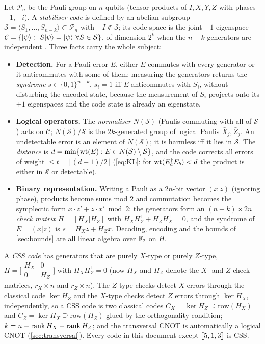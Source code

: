 Let $\mathcal P_n$ be the Pauli group on $n$ qubits (tensor products of $I,X,Y,Z$ with phases $\pm1,\pm i$). A \emph{stabiliser code} is defined by an abelian subgroup $\mathcal S=\langle S_1,\dots,S_{n-k}\rangle\subset\mathcal P_n$ with $-I\notin\mathcal S$; its code space is the joint $+1$ eigenspace $\mathcal C=\{\ket\psi:\ S\ket\psi=\ket\psi\ \forall S\in\mathcal S\}$, of dimension $2^k$ when the $n-k$ generators are independent \cite{gottesman97,crss98}. Three facts carry the whole subject:
\begin{itemize}[leftmargin=*]
\item \textbf{Detection.} For a Pauli error $E$, either $E$ commutes with every generator or it anticommutes with some of them; measuring the generators returns the \emph{syndrome} $s\in\{0,1\}^{n-k}$, $s_i=1$ iff $E$ anticommutes with $S_i$, without disturbing the encoded state, because the measurement of $S_i$ projects onto its $\pm1$ eigenspaces and the code state is already an eigenstate.
\item \textbf{Logical operators.} The \emph{normaliser} $N(\mathcal S)$ (Paulis commuting with all of $\mathcal S$) acts on $\mathcal C$; $N(\mathcal S)/\mathcal S$ is the $2k$-generated group of logical Paulis $\bar X_j,\bar Z_j$. An undetectable error is an element of $N(\mathcal S)$; it is harmless iff it lies in $\mathcal S$. The \emph{distance} is $d=\min\{\operatorname{wt}(E):E\in N(\mathcal S)\setminus\mathcal S\}$, and the code corrects all errors of weight $\le t=\lfloor(d-1)/2\rfloor$ (\cref{eq:KL}: for $\operatorname{wt}(E_a^\dagger E_b)<d$ the product is either in $\mathcal S$ or detectable).
\item \textbf{Binary representation.} Writing a Pauli as a $2n$-bit vector $(x|z)$ (ignoring phase), products become sums mod $2$ and commutation becomes the symplectic form $x\cdot z'+z\cdot x'\bmod2$; the generators form an $(n-k)\times2n$ \emph{check matrix} $H=[H_X|H_Z]$ with $H_XH_Z^{\mathsf T}+H_ZH_X^{\mathsf T}=0$, and the syndrome of $E=(x|z)$ is $s=H_Xz+H_Zx$. Decoding, encoding and the bounds of \cref{sec:bounds} are all linear algebra over $\mathbb{F}_2$ on $H$.
\end{itemize}
A \emph{CSS code} \cite{calderbank-shor96,steane96} has generators that are purely $X$-type or purely $Z$-type, $H=\big[\begin{smallmatrix}H_X&0\\0&H_Z\end{smallmatrix}\big]$ with $H_XH_Z^{\mathsf T}=0$ (now $H_X$ and $H_Z$ denote the $X$- and $Z$-check matrices, $r_X\times n$ and $r_Z\times n$). The $Z$-type checks detect $X$ errors through the classical code $\ker H_Z$ and the $X$-type checks detect $Z$ errors through $\ker H_X$, independently, so a CSS code is two classical codes $C_X=\ker H_Z\supseteq\mathrm{row}(H_X)$ and $C_Z=\ker H_X\supseteq\mathrm{row}(H_Z)$ glued by the orthogonality condition; $k=n-\operatorname{rank} H_X-\operatorname{rank} H_Z$; and the transversal CNOT is automatically a logical CNOT (\cref{sec:transversal}). Every code in this document except $[\![5,1,3]\!]$ is CSS.

